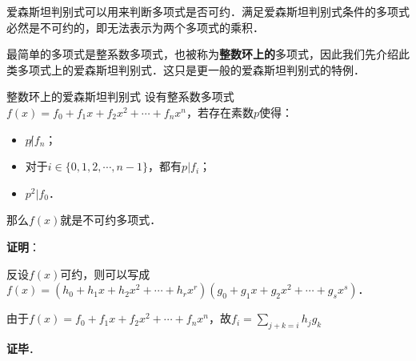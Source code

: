 
爱森斯坦判别式可以用来判断多项式是否可约．满足爱森斯坦判别式条件的多项式必然是不可约的，即无法表示为两个多项式的乘积．

最简单的多项式是整系数多项式，也被称为\textbf{整数环上的}多项式，因此我们先介绍此类多项式上的爱森斯坦判别式．这只是更一般的爱森斯坦判别式的特例．

\begin{theorem}{整数环上的爱森斯坦判别式}
设有整系数多项式$f(x)=f_0+f_1x+f_2x^2+\cdots+f_nx^n$，若存在素数$p$使得：
\begin{itemize}
\item $p\not|f_n$；
\item 对于$i\in\{0, 1, 2, \cdots, n-1\}$，都有$p|f_i$；
\item $p^2|f_0$．
\end{itemize}
那么$f(x)$就是不可约多项式．
\end{theorem}

\textbf{证明}：

反设$f(x)$可约，则可以写成$f(x)=(h_0+h_1x+h_2x^2+\cdots+h_rx^r)(g_0+g_1x+g_2x^2+\cdots+g_sx^s)$．

由于$f(x)=f_0+f_1x+f_2x^2+\cdots+f_nx^n$，故$f_i=\sum\limits_{j+k=i}h_jg_k$

\textbf{证毕}．







